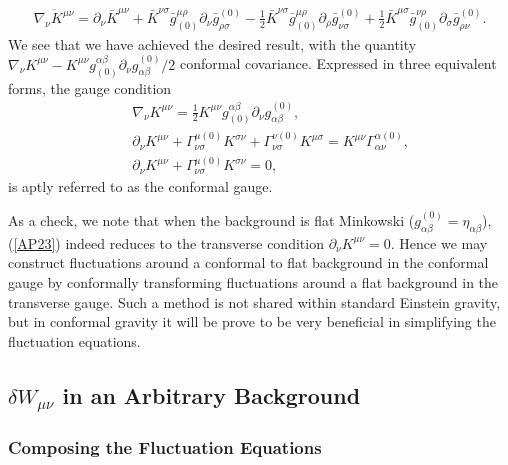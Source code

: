 %
\begin{eqnarray}
\overline{\nabla_{\nu}K^{\mu\nu}}=
\partial_{\nu}\bar{K}^{\mu\nu}
+\bar{K}^{\nu\sigma}\bar{g}_{(0)}^{\mu\rho}\partial_{\nu}\bar{g}^{(0)}_{\rho\sigma}
-\frac{1}{2}\bar{K}^{\nu\sigma}\bar{g}_{(0)}^{\mu\rho}\partial_{\rho}\bar{g}^{(0)}_{\nu\sigma}
+\frac{1}{2}\bar{K}^{\mu\sigma}\bar{g}_{(0)}^{\nu\rho}\partial_{\sigma}\bar{g}^{(0)}_{\rho\nu}.
\label{AP22}
\end{eqnarray}
% 
We see that we have achieved the desired result, with the quantity $\nabla_{\nu}K^{\mu\nu}- K^{\mu\nu}g_{(0)}^{\alpha\beta}\partial_{\nu}g^{(0)}_{\alpha\beta}/2$ conformal covariance. Expressed in three equivalent forms, the gauge condition
%
\begin{eqnarray}
&&\nabla_{\nu}K^{\mu\nu}=\frac{1}{2}K^{\mu\nu}g_{(0)}^{\alpha\beta}\partial_{\nu}g^{(0)}_{\alpha\beta},
\nonumber\\
&&\partial_{\nu}K^{\mu\nu}+\Gamma^{\mu(0)}_{\nu\sigma}K^{\sigma\nu}
+\Gamma^{\nu(0)}_{\nu\sigma}K^{\mu\sigma}=K^{\mu\nu}\Gamma^{\alpha(0)}_{\alpha\nu},
\nonumber\\
&&\partial_{\nu}K^{\mu\nu}+\Gamma^{\mu(0)}_{\nu\sigma}K^{\sigma\nu}=0,
\label{AP23}
\end{eqnarray}
%
is aptly referred to as the conformal gauge.

As a check, we note that when the background is flat Minkowski ($g^{(0)}_{\alpha\beta}=\eta_{\alpha\beta}$), (\ref{AP23}) indeed reduces to the transverse condition $\partial_{\nu}K^{\mu\nu}=0$. Hence we may construct fluctuations around a conformal to flat background in the conformal gauge by conformally transforming fluctuations around a flat background in the transverse gauge. Such a method is not shared within standard Einstein gravity, but in conformal gravity it will be prove to be very beneficial in simplifying the fluctuation equations. 

\subsection{$\delta W_{\mu\nu}$ in an Arbitrary Background}
\label{ss:fluctuation_eqns_around_arb_background_cgauge}

\subsubsection{Composing the Fluctuation Equations}
\label{sss:setting_up_fluctuation_eqns_cgauge}

